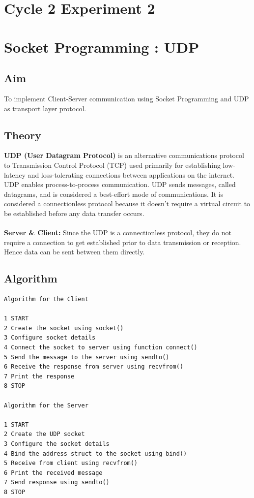 \section*{Cycle 2 Experiment 2}

\section{\Large{Socket Programming : UDP}}

\subsection{Aim}
\large To implement Client-Server communication using Socket Programming and UDP as transport layer protocol.

\subsection{Theory}
\textbf{UDP (User Datagram Protocol)} is an alternative communications protocol to Transmission Control Protocol (TCP) used primarily for establishing low-latency and loss-tolerating connections between applications on the internet. UDP enables
process-to-process communication. UDP sends messages, called datagrams, and is considered a best-effort mode of communications. It is considered a connectionless protocol because it doesn’t require a virtual circuit to be established before any data
transfer occurs.\\
\\
\textbf{Server \& Client:} Since the UDP is a connectionless protocol, they do not require a connection to get established prior to data transmission or reception. Hence data can be sent between them directly.
\subsection{Algorithm}
\begin{verbatim}
Algorithm for the Client

1 START
2 Create the socket using socket()
3 Configure socket details
4 Connect the socket to server using function connect()
5 Send the message to the server using sendto() 
6 Receive the response from server using recvfrom()
7 Print the response
8 STOP

Algorithm for the Server

1 START
2 Create the UDP socket
3 Configure the socket details
4 Bind the address struct to the socket using bind()
5 Receive from client using recvfrom()
6 Print the received message
7 Send response using sendto()
8 STOP
\end{verbatim}

